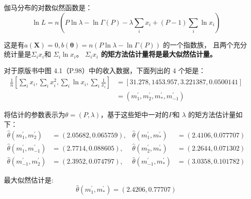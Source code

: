 \begin{myexample}[实例 3（续前例）]
    伽马分布的对数似然函数是：
    $$ \ln L=n\left(P \ln \lambda-\ln \Gamma(P)-\lambda \sum_{i} x_{i}+(P-1) \sum_{i} \ln x_{i}\right) $$

    这是有$ a(\boldsymbol{X})=0, b(\boldsymbol{\theta})=n(P \ln \lambda-\ln \Gamma(P)) $ 的一个指数族，
    且两个充分统计量是$ \Sigma_{i} x_{i} $和 $ \Sigma_{i} \ln x_{i} $。
   {\bf $ \Sigma_{i} x_{i} $ 的矩方法估计量将是最大似然估计量。}

   对于原版书中图 4.1（P.98）中的收入数据，下面列出的 4 个矩是：
   $$ \begin{aligned}
        \frac{1}{n}\left[\sum_{i} x_{i}, \sum_{i} x_{i}^{2}, \sum_{i} \ln x_{i}, \sum_{i} \frac{1}{x_{i}}\right] & = [31.278,1453.957,3.221387,0.0500141] \\ & = \left(m_{1}^{\prime}, m_{2}^{\prime}, m_{*}^{\prime}, m_{-1}^{\prime}\right)
    \end{aligned} $$

    将估计的参数表示为$ \theta  = ( P, \lambda) $，基于这些矩中一对的$ P $和 $ \lambda$ 的矩方法估计量如下：
    $$ \begin{aligned}
        \hat{\theta}\left(m_{1}^{\prime}, m_{2}^{\prime}\right) & = (2.05682,0.065759), & \hat{\theta}\left(m_{1}^{\prime}, m_{*}^{\prime}\right) & = (2.4106,0.077707) \\
        \hat{\theta}\left(m_{1}^{\prime}, m_{-1}^{\prime}\right) & = (2.7714,0.088605), & \hat{\theta}\left(m_{2}^{\prime}, m_{*}^{\prime}\right) & = (2.2644,0.071302) \\
        \hat{\theta}\left(m_{-1}^{\prime}, m_{2}^{\prime}\right) & = (2.3952,0.074797), & \hat{\theta}\left(m_{-1}^{\prime}, m_{*}^{\prime}\right) & = (3.0358,0.101782)
        \end{aligned} $$

    最大似然估计是:
    $$ \hat{\theta}\left(m_{1}^{\prime}, m_{*}^{\prime}\right)=(2.4206,0.77707) $$
\end{myexample}

